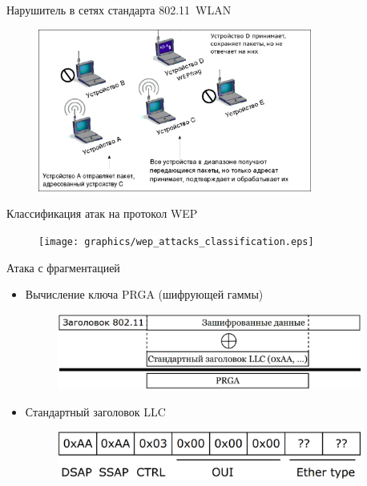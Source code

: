 \documentclass[12pt]{beamer}
\begin{document}
\begin{frame}{Нарушитель в сетях стандарта 802.11~WLAN\newline}

    \begin{figure}
        \includegraphics[width=9cm]{graphics/wlan_diagram_with_attacker.eps}
    \end{figure}

\end{frame} 


\begin{frame}{Классификация атак на протокол WEP}

    \begin{figure}
        \texttt{[image: graphics/wep\_attacks\_classification.eps]}
    \end{figure}

\end{frame} 


\begin{frame}{Атака с фрагментацией}

    \begin{itemize}

        \item Вычисление ключа PRGA (шифрующей гаммы)
            \begin{figure}
                \includegraphics[width=10cm]{graphics/restore_part_of_gamma.eps}
            \end{figure}

        \item Стандартный заголовок LLC
            \begin{figure}
                \includegraphics[width=10cm]{graphics/default_llc_header.eps}
            \end{figure}
    \end{itemize}

\end{frame} 
\end{document}

